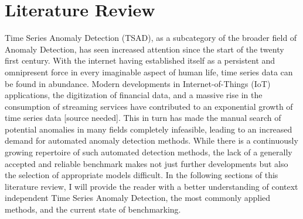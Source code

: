 \documentclass[12pt,oneside]{article}
\begin{document}
\section{Literature Review} \label{einleitung}
Time Series Anomaly Detection (TSAD), as a subcategory of the broader field of Anomaly Detection, has seen increased attention since the start of the twenty first century. With the internet having established itself as a persistent and omnipresent force in every imaginable aspect of human life, time series data can be found in abundance. Modern developments in Internet-of-Things (IoT) applications, the digitization of financial data, and a massive rise in the consumption of streaming services have contributed to an exponential growth of time series data [source needed]. This in turn has made the manual search of potential anomalies in many fields completely infeasible, leading to an increased demand for automated anomaly detection methods. While there is a continuously growing repertoire of such automated detection methods, the lack of a generally accepted and reliable benchmark makes not just further developments but also the selection of appropriate models difficult. In the following sections of this literature review, I will provide the reader with a better understanding of context independent Time Series Anomaly Detection, the most commonly applied methods, and the current state of benchmarking.
\end{document}
